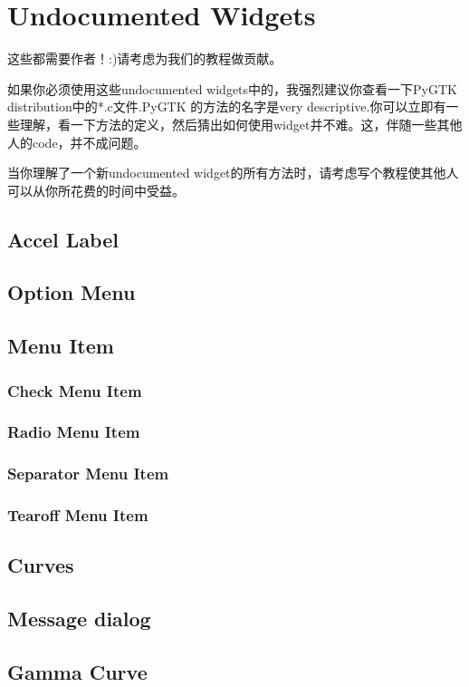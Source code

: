 \chapter{Undocumented Widgets}
这些都需要作者！:)请考虑为我们的教程做贡献。

如果你必须使用这些undocumented widgets中的，我强烈建议你查看一下PyGTK distribution中的*.c文件.PyGTK 的方法的名字是very descriptive.你可以立即有一些理解，看一下方法的定义，然后猜出如何使用widget并不难。这，伴随一些其他人的code，并不成问题。

当你理解了一个新undocumented widget的所有方法时，请考虑写个教程使其他人可以从你所花费的时间中受益。
\section{Accel Label}
\section{Option Menu}
\section{Menu Item}
	\subsection{Check Menu Item}
	\subsection{Radio Menu Item}
	\subsection{Separator Menu Item}
	\subsection{Tearoff Menu Item}
\section{Curves}
\section{Message dialog}
\section{Gamma Curve}
